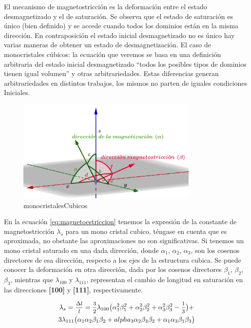 El mecanismo de magnetostricción es la deformación entre el estado desmagnetizado y el de
saturación. Se observa que el estado de saturación es único (bien definido) y se accede cuando todos los dominios están en la misma dirección. En contraposición el estado inicial desmagnetizado no es único hay varias maneras de obtener un estado de desmagnetización. El caso de monocristales cúbicos: la ecuación que veremos se basa en una definición arbitraria del estado inicial desmagnetizado “todos los posibles tipos de dominios tienen igual volumen” y otras arbitrariedades. Estas diferencias generan arbitrariedades en distintos trabajos, los mismos no parten de iguales condiciones Iniciales.


\begin{figure}[H]
    \centering
    \includegraphics[width=0.8\textwidth]{./Figures/monocristalesCubicos}
	\caption{monocristalesCubicos}
	\label{fig:monocristalesCubicos}
\end{figure}


En la ecuación \ref{eq:magnetoestriccion} tenemos la expresión de la constante de magnetostricción $\lambda_{s}$ para un mono cristal cubico, téngase en cuenta que es aproximada, no obstante las aproximaciones no son significativas. Si tenemos un mono cristal
saturado en una dada dirección, donde $\alpha_{1}$, $\alpha_{2}$, $\alpha_{3}$, son los cosenos directores de esa dirección, respecto a los ejes de la estructura cubica. Se puede conocer la deformación en otra dirección, dada por los cosenos directores $\beta_{1}$, $\beta_{2}$, $\beta_{3}$, mientras que $\lambda_{100}$ y $\lambda_{111}$, representan el cambio de longitud en saturación en las direcciones \textbf{[100]} y \textbf{[111]}, respectivamente.

\begin{multline}
	\lambda_{s}=\mfrac{\Delta l}{l}=\mfrac{3}{2}\lambda_{100}\big(\alpha_{1}^{2}\beta_{1}^{2}+
	\alpha_{2}^{2}\beta_{2}^{2}+\alpha_{3}^{2}\beta_{3}^{2}-\mfrac{1}{3} \big)+\\
	3\lambda_{111}\big(\alpha_{1}\alpha_{2}\beta_{1}\beta_{2}+
	alpha_{3}\alpha_{2}\beta_{3}\beta_{2}+\alpha_{1}\alpha_{3}\beta_{1}\beta_{3} \big)
	\label{eq:magnetoestriccion1}
\end{multline}

